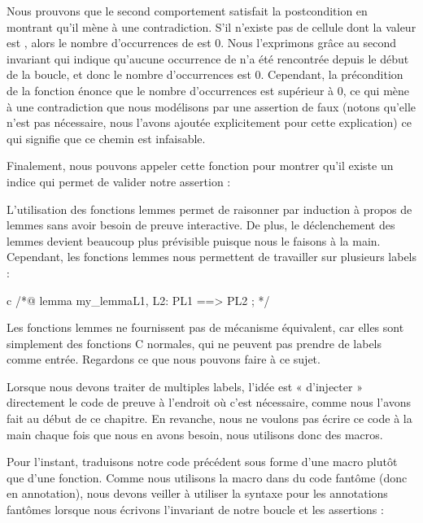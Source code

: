 Nous prouvons que le second comportement satisfait la postcondition en montrant
qu'il mène à une contradiction. S'il n'existe pas de cellule dont la valeur est
, alors le nombre d'occurrences de  est 0. Nous
l'exprimons grâce au second invariant qui indique qu'aucune occurrence de
 n'a été rencontrée depuis le début de la boucle, et donc le
nombre d'occurrences est 0. Cependant, la précondition de la fonction énonce que
le nombre d'occurrences est supérieur à 0, ce qui mène à une contradiction que
nous modélisons par une assertion de faux (notons qu'elle n'est pas nécessaire,
nous l'avons ajoutée explicitement pour cette explication) ce qui signifie que
ce chemin est infaisable.


Finalement, nous pouvons appeler cette fonction pour montrer qu'il existe un
indice qui permet de valider notre assertion :




L'utilisation des fonctions lemmes permet de raisonner par induction à propos de
lemmes sans avoir besoin de preuve interactive. De plus, le déclenchement des
lemmes devient beaucoup plus prévisible puisque nous le faisons à la main.
Cependant, les fonctions lemmes nous permettent de travailler sur plusieurs labels :



\begin{CodeBlock}{c}
/*@
  lemma my_lemma{L1, L2}:  P{L1} ==> P{L2} ;
*/
\end{CodeBlock}


Les fonctions lemmes ne fournissent pas de mécanisme équivalent, car elles sont
simplement des fonctions C normales, qui ne peuvent pas prendre de labels comme
entrée. Regardons ce que nous pouvons faire à ce sujet.





Lorsque nous devons traiter de multiples labels, l'idée est « d'injecter »
directement le code de preuve à l'endroit où c'est nécessaire, comme nous
l'avons fait au début de ce chapitre. En revanche, nous ne voulons pas écrire
ce code à la main chaque fois que nous en avons besoin, nous utilisons donc des
macros.


Pour l'instant, traduisons notre code précédent sous forme d'une macro plutôt que
d'une fonction. Comme nous utilisons la macro dans du code fantôme (donc en
annotation), nous devons veiller à utiliser la syntaxe pour les annotations fantômes
lorsque nous écrivons l'invariant de notre boucle et les assertions :


